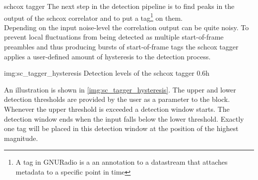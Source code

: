 \begin{subchapter}{\acrlong{schcox} tagger}
  The next step in the detection pipeline is to find peaks in
  the output of the \acrlong{schcox} correlator and to put
  a tag\footnote{A tag in GNURadio is a an annotation to a
  datastream that attaches metadata to a specific point in time}
  on them. \\

  Depending on the input noise-level the correlation output
  can be quite noisy. To prevent local fluctuations from being
  detected as multiple start-of-frame preambles and thus producing
  bursts of start-of-frame tags the \acrshort{schcox} tagger
  applies a user-defined amount of hysteresis to the detection
  process.

               {img:sc_tagger_hysteresis}
               {Detection levels of the \acrshort{schcox} tagger}
               {0.6}{h}

  An illustration is shown in \autoref{img:sc_tagger_hysteresis}.
  The upper and lower detection thresholds are provided by
  the user as a parameter to the block. \\

  Whenever the upper threshold is exceeded a detection window starts.
  The detection window ends when the input falls below the lower
  threshold.
  Exactly one tag will be placed in this detection window at
  the position of the highest magnitude.
\end{subchapter}

